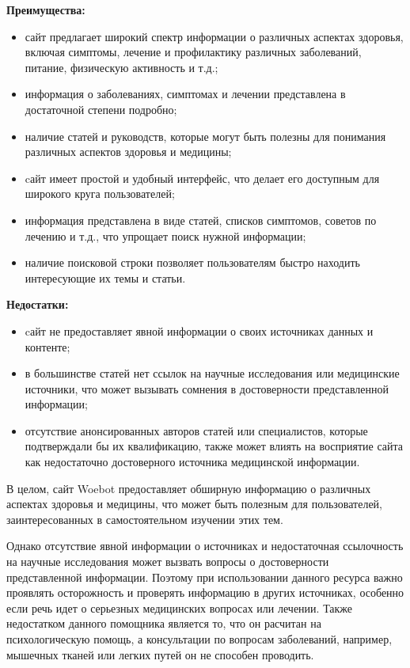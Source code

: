 \begin{enumerate}[label=\arabic*)]
\textbf{Преимущества:}
\begin{itemize}
    \item сайт предлагает широкий спектр информации о различных аспектах здоровья, включая симптомы, лечение и профилактику различных заболеваний, питание, физическую активность и т.д.;
    \item информация о заболеваниях, симптомах и лечении представлена в достаточной степени подробно;
    \item наличие статей и руководств, которые могут быть полезны для понимания различных аспектов здоровья и медицины;
    \item cайт имеет простой и удобный интерфейс, что делает его доступным для широкого круга пользователей;
    \item информация представлена в виде статей, списков симптомов, советов по лечению и т.д., что упрощает поиск нужной информации;
    \item наличие поисковой строки позволяет пользователям быстро находить интересующие их темы и статьи.
\end{itemize}
\textbf{Недостатки: }
\begin{itemize}
    \item cайт не предоставляет явной информации о своих источниках данных и контенте;
    \item в большинстве статей нет ссылок на научные исследования или медицинские источники, что может вызывать сомнения в достоверности представленной информации;
    \item отсутствие анонсированных авторов статей или специалистов, которые подтверждали бы их квалификацию, также может влиять на восприятие сайта как недостаточно достоверного источника медицинской информации.
\end{itemize}

В целом, сайт Woebot предоставляет обширную информацию о различных аспектах здоровья и медицины, что может быть полезным для пользователей, заинтересованных в самостоятельном изучении этих тем.

Однако отсутствие явной информации о источниках и недостаточная ссылочность на научные исследования может вызвать вопросы о достоверности представленной информации. Поэтому при использовании данного ресурса важно проявлять осторожность и проверять информацию в других источниках, особенно если речь идет о серьезных медицинских вопросах или лечении. Также недостатком данного помощника является то, что он расчитан на психологическую помощь, а консультации по вопросам заболеваний, например, мышечных тканей или легких путей он не способен проводить. 



\end{enumerate}
